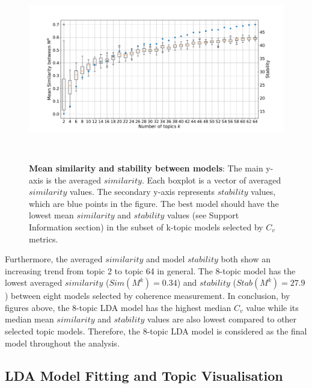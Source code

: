 \begin{figure}[H]
    \centering
    \includegraphics[width = 16cm, height = 8cm]{./img/jsd_boxplot.pdf}
    \caption[Mean similarity and stability between models]{\textbf{Mean similarity and stability between models}: The main y-axis is the averaged $similarity$. Each boxplot is a vector of averaged $similarity$ values. The secondary y-axis represents $stability$ values, which are blue points in the figure. The best model should have the lowest mean $similarity$ and $stability$ values (see Support Information section) in the subset of k-topic models selected by $C_v$ metrics.}
\end{figure}

Furthermore, the averaged $similarity$ and model $stability$ both show an increasing trend from topic 2 to topic 64 in general. The 8-topic model has the lowest averaged $similarity$ ($Sim(M^k) = 0.34$) and $stability$ ($Stab(M^k) = 27.9$) between eight models selected by coherence measurement. In conclusion, by figures above, the 8-topic LDA model has the highest median $C_v$ value while its median mean $similarity$ and $stability$ values are also lowest compared to other selected topic models. Therefore, the 8-topic LDA model is considered as the final model throughout the analysis.

\subsection{LDA Model Fitting and Topic Visualisation}

